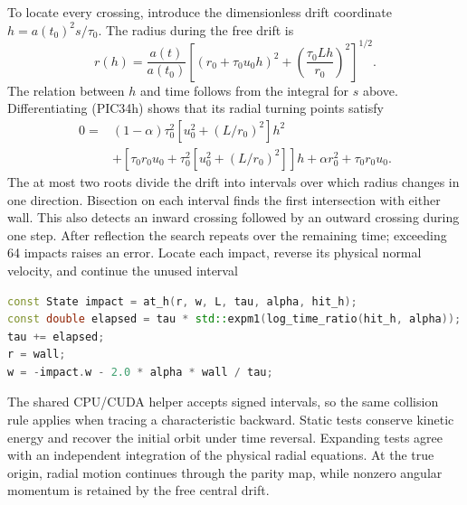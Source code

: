 To locate every crossing, introduce the dimensionless drift coordinate
\(h=a(t_0)^2s/\tau_0\). The radius during the free drift is
\[
 r(h)=\frac{a(t)}{a(t_0)}
 \left[(r_0+\tau_0u_0h)^2+
       \left(\frac{\tau_0Lh}{r_0}\right)^2\right]^{1/2}. \tag{PIC34h}
\]
The relation between \(h\) and time follows from the integral for \(s\)
above. Differentiating (PIC34h) shows that its radial turning points satisfy
\[
 \begin{split}
 0={}&(1-\alpha)\tau_0^2
       \left[u_0^2+(L/r_0)^2\right]h^2\\
 &+\left[\tau_0r_0u_0+
        \tau_0^2\left[u_0^2+(L/r_0)^2\right]\right]h
   +\alpha r_0^2+\tau_0r_0u_0 .
 \end{split}
 \tag{PIC34i}
\]
The at most two roots divide the drift into intervals over which radius
changes in one direction. Bisection on each interval finds the first
intersection with either wall. This also detects an inward crossing followed
by an outward crossing during one step. After reflection the search repeats
over the remaining time; exceeding 64 impacts raises an error.
{}
{Locate each impact, reverse its physical normal velocity, and continue the unused interval}
\begin{lstlisting}[language=C++]
const State impact = at_h(r, w, L, tau, alpha, hit_h);
const double elapsed = tau * std::expm1(log_time_ratio(hit_h, alpha));
tau += elapsed;
r = wall;
w = -impact.w - 2.0 * alpha * wall / tau;
\end{lstlisting}
The shared CPU/CUDA helper accepts signed intervals, so the same collision
rule applies when tracing a characteristic backward. Static tests conserve
kinetic energy and recover the initial orbit under time reversal. Expanding
tests agree with an independent integration of the physical radial equations.
At the true origin, radial motion continues through the parity map, while
nonzero angular momentum is retained by the free central drift.


